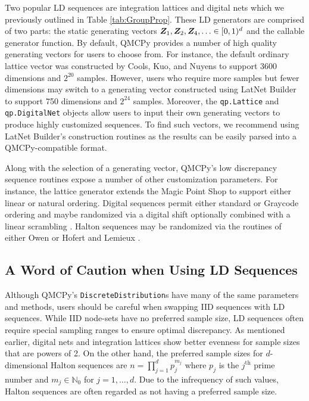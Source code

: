 \documentclass[graybox,footinfo]{svmult}
\begin{document}
Two popular LD sequences are integration lattices and digital nets which we previously outlined in Table \ref{tab:GroupProp}. These LD generators are comprised of two parts: the static generating vectors ${\boldsymbol{Z}}_1,{\boldsymbol{Z}}_2,{\boldsymbol{Z}}_4, \ldots \in [0,1)^d$ and the callable generator function. By default, QMCPy provides a number of high quality generating vectors for users to choose from. For instance, the default ordinary lattice vector was constructed by Cools, Kuo, and Nuyens \cite{doi:10.1137/06065074X} to support 3600 dimensions and $2^{20}$ samples. However, users who require more samples but fewer dimensions may switch to a generating vector constructed using LatNet Builder \cite{LEcEtal22a,LatNet} to support 750 dimensions and $2^{24}$ samples. Moreover, the \texttt{qp.Lattice} and \texttt{qp.DigitalNet} objects allow users to input their own generating vectors to produce highly customized sequences. To find such vectors, we recommend using LatNet Builder's construction routines as the results can be easily parsed into a QMCPy-compatible format. 

Along with the selection of a generating vector, QMCPy's low discrepancy sequence routines expose a number of other customization parameters. For instance, the lattice generator extends the Magic Point Shop \cite{Nuy17a} to support either linear or natural ordering. Digital sequences permit either standard or Graycode ordering and maybe randomized via a digital shift optionally combined with a linear scrambling \cite{Mat98}. Halton sequences may be randomized via the routines of either Owen \cite{Owe20a} or Hofert and Lemieux \cite{QRNG2020}. 

\subsection{A Word of Caution when Using LD Sequences}

Although QMCPy's \texttt{DiscreteDistribution}s have many of the same parameters and methods, users should be careful when swapping IID sequences with LD sequences. While IID node-sets have no preferred sample size, LD sequences often require special sampling ranges to ensure optimal discrepancy. As mentioned  earlier, digital nets and integration lattices show better evenness for sample sizes that are powers of 2. On the other hand, the preferred sample sizes for $d$-dimensional Halton sequences are $n = \prod_{j=1}^d p^{m_j}_j$ where $p_j$ is the $j^{\text{th}}$ prime number and $m_j \in \mathbb{N}_0$ for $j=1,\dots,d$. Due to the infrequency of such values, Halton sequences are often regarded as not having a preferred sample size.  
\end{document}
